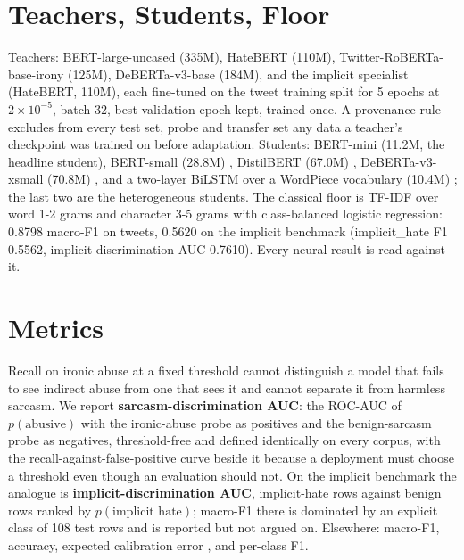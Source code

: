 \section{Teachers, Students, Floor}
\label{sec:4.5}
Teachers: BERT-large-uncased (335M), HateBERT (110M), Twitter-RoBERTa-base-irony (125M),
DeBERTa-v3-base (184M), and the implicit specialist (HateBERT, 110M), each fine-tuned on the tweet
training split for 5 epochs at $2 \times 10^{-5}$, batch 32, best validation epoch kept, trained
once. A provenance rule excludes from every test set, probe and transfer set any data a teacher's
checkpoint was trained on before adaptation. Students: BERT-mini (11.2M, the headline student),
BERT-small (28.8M) \cite{turc2019wellread}, DistilBERT (67.0M) \cite{sanh2019distilbert},
DeBERTa-v3-xsmall (70.8M) \cite{he2023debertav3}, and a two-layer BiLSTM over a WordPiece vocabulary
(10.4M) \cite{tang2019distilling}; the last two are the heterogeneous students. The classical floor
is TF-IDF over word 1-2 grams and character 3-5 grams with class-balanced logistic regression:
0.8798 macro-F1 on tweets, 0.5620 on the implicit benchmark (implicit\_hate F1 0.5562,
implicit-discrimination AUC 0.7610). Every neural result is read against it.
\section{Metrics}
\label{sec:4.6}
Recall on ironic abuse at a fixed threshold cannot distinguish a model that fails to see indirect
abuse from one that sees it and cannot separate it from harmless sarcasm. We report
\textbf{sarcasm-discrimination AUC}: the ROC-AUC of $p(\text{abusive})$ with the ironic-abuse probe
as positives and the benign-sarcasm probe as negatives, threshold-free and defined identically on
every corpus, with the recall-against-false-positive curve beside it because a deployment must
choose a threshold even though an evaluation should not. On the implicit benchmark the analogue is
\textbf{implicit-discrimination AUC}, implicit-hate rows against benign rows ranked by
$p(\text{implicit hate})$; macro-F1 there is dominated by an explicit class of 108 test rows and is
reported but not argued on. Elsewhere: macro-F1, accuracy, expected calibration error
\cite{guo2017calibration}, and per-class F1.
